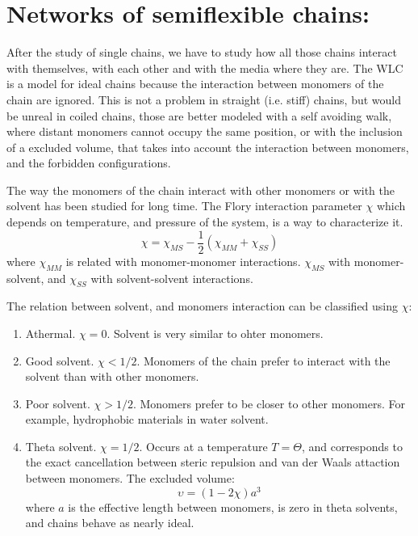 \section{Networks of semiflexible chains:}
After the study of single chains, we have to study how all those chains interact
with themselves, with each other and with the media where they are.
The WLC is a model for ideal chains because the interaction between
monomers of the chain are ignored. This is not a problem in straight
(i.e. stiff) chains, but would be unreal in coiled chains, those are better
modeled with a self avoiding walk, where distant monomers cannot occupy the
same position, or with the inclusion of a excluded volume, that takes into
account the interaction between monomers, and the forbidden configurations.

The way the monomers of the chain interact with other monomers or with the
solvent has been studied for long time. The Flory interaction parameter $\chi$
which depends on temperature, and pressure of the system, is a way to
characterize it.
\begin{equation}\label{FloryInteraction}
\chi=\chi_{MS} - \frac{1}{2}(\chi_{MM} + \chi_{SS})
\end{equation}
where  $\chi_{MM}$ is related with monomer-monomer interactions. $\chi_{MS}$
with monomer-solvent, and $\chi_{SS}$ with solvent-solvent
interactions.

The relation between solvent, and monomers interaction can be classified using
$\chi$:
\begin{enumerate}
  \item Athermal. $\chi=0$. Solvent is very similar to ohter monomers.
  \item Good solvent. $\chi<1/2$. Monomers of the chain prefer to interact with
  the solvent than with other monomers.
  \item Poor solvent. $\chi>1/2$. Monomers prefer to be closer to other
  monomers. For example, hydrophobic materials in water solvent.
  \item Theta solvent. $\chi=1/2$. Occurs at a temperature $T=\Theta$, and
  corresponds to the exact cancellation between steric repulsion and van der
  Waals attaction between monomers. The excluded volume:
  \begin{equation}\label{excludedvolume}
  \upsilon=(1-2\chi)a^3
  \end{equation}
  where $a$ is the effective length between monomers, is zero in theta solvents,
  and chains behave as nearly ideal.\citep{gennes_scaling_1979}
\end{enumerate}

